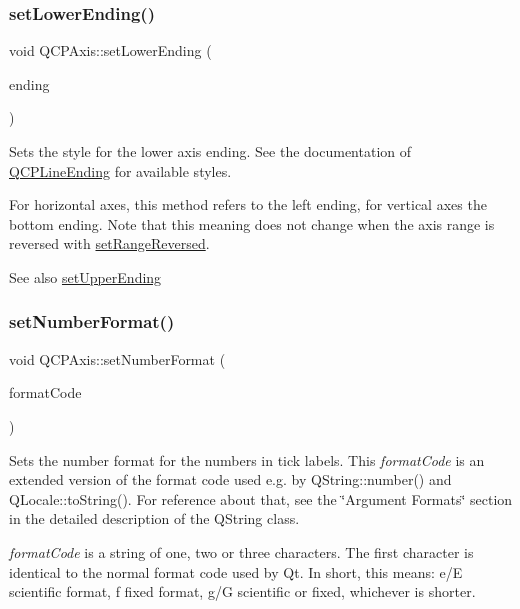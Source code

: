 \subsubsection{\texorpdfstring{set\+Lower\+Ending()}{setLowerEnding()}}
{\footnotesize\ttfamily void Q\+C\+P\+Axis\+::set\+Lower\+Ending (\begin{DoxyParamCaption}\item[{const \hyperlink{classQCPLineEnding}{Q\+C\+P\+Line\+Ending} \&}]{ending }\end{DoxyParamCaption})}

Sets the style for the lower axis ending. See the documentation of \hyperlink{classQCPLineEnding}{Q\+C\+P\+Line\+Ending} for available styles.

For horizontal axes, this method refers to the left ending, for vertical axes the bottom ending. Note that this meaning does not change when the axis range is reversed with \hyperlink{classQCPAxis_a2172fdb196b1a0dc3f40992fcad8e9e1}{set\+Range\+Reversed}.

\begin{DoxySeeAlso}{See also}
\hyperlink{classQCPAxis_a69119b892fc306f651763596685aa377}{set\+Upper\+Ending} 
\end{DoxySeeAlso}
\mbox{\label{classQCPAxis_ae585a54dc2aac662e90a2ca82f002590}} 
\subsubsection{\texorpdfstring{set\+Number\+Format()}{setNumberFormat()}}
{\footnotesize\ttfamily void Q\+C\+P\+Axis\+::set\+Number\+Format (\begin{DoxyParamCaption}\item[{const Q\+String \&}]{format\+Code }\end{DoxyParamCaption})}

Sets the number format for the numbers in tick labels. This {\itshape format\+Code} is an extended version of the format code used e.\+g. by Q\+String\+::number() and Q\+Locale\+::to\+String(). For reference about that, see the \char`\"{}\+Argument Formats\char`\"{} section in the detailed description of the Q\+String class.

{\itshape format\+Code} is a string of one, two or three characters. The first character is identical to the normal format code used by Qt. In short, this means\+: \textquotesingle{}e\textquotesingle{}/\textquotesingle{}E\textquotesingle{} scientific format, \textquotesingle{}f\textquotesingle{} fixed format, \textquotesingle{}g\textquotesingle{}/\textquotesingle{}G\textquotesingle{} scientific or fixed, whichever is shorter.

